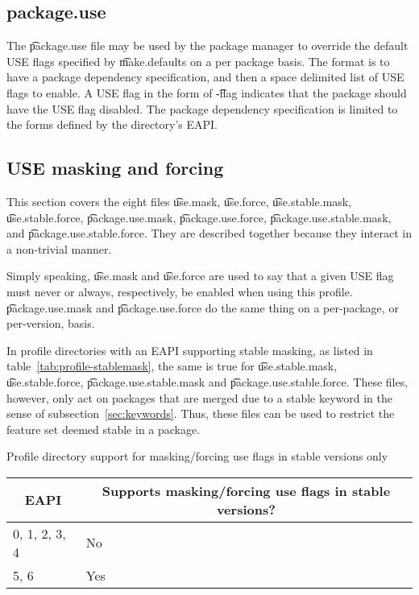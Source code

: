 \subsection{package.use}
The \t{package.use} file may be used by the package manager to override the default USE flags specified
by \t{make.defaults} on a per package basis.  The format is to have a package dependency specification,
and then a space delimited list of USE flags to enable.  A USE flag in the form of \t{-flag} indicates
that the package should have the USE flag disabled.  The package dependency specification is limited to
the forms defined by the directory's EAPI.

\subsection{USE masking and forcing}
This section covers the eight files \t{use.mask}, \t{use.force}, \t{use.stable.mask},
\t{use.stable.force}, \t{package.use.mask}, \t{package.use.force}, \t{package.use.stable.mask},
and \t{package.use.\allowbreak stable.force}. They are described together because they interact in
a non-trivial manner.

Simply speaking, \t{use.mask} and \t{use.force} are used to say that a given USE flag must never or
always, respectively, be enabled when using this profile. \t{package.use.mask} and
\t{package.use.force} do the same thing on a per-package, or per-version, basis.

In profile directories with an EAPI supporting stable masking, as listed in
table~\ref{tab:profile-stablemask}, the same is true for \t{use.stable.mask}, \t{use.stable.force},
\t{package.use.stable.mask} and \t{package.use.\allowbreak stable.force}. These files, however,
only act on packages that are merged due to a stable keyword in the sense of
subsection~\ref{sec:keywords}. Thus, these files can be used to restrict the feature set deemed
stable in a package.

\begin{centertable}{Profile directory support for masking/forcing use flags in stable versions only}
    \label{tab:profile-stablemask}
    \begin{tabular}{ll}
      \toprule
      \multicolumn{1}{c}{\textbf{EAPI}} &
      \multicolumn{1}{c}{\textbf{Supports masking/forcing use flags in stable versions?}} \\
      \midrule
      0, 1, 2, 3, 4     & No  \\
      5, 6              & Yes \\
      \bottomrule
    \end{tabular}
\end{centertable}

